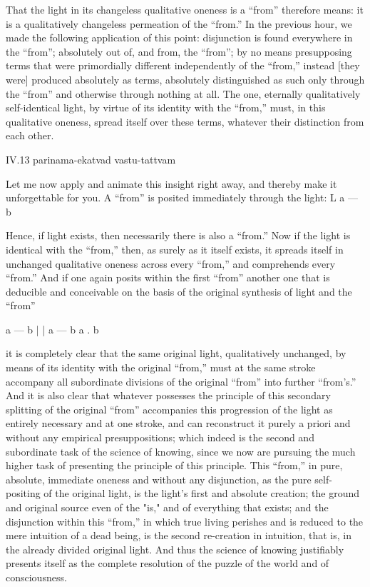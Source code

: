 That the light in its changeless qualitative oneness
is a “from” therefore means:
it is a qualitatively changeless
permeation of the “from.”
In the previous hour,
we made the following application of this point:
disjunction is found everywhere in the “from”;
absolutely out of, and from, the “from”;
by no means presupposing terms
that were primordially different
independently of the “from,”
instead [they were] produced absolutely as terms,
absolutely distinguished as such
only through the “from”
and otherwise through nothing at all.
The one, eternally qualitatively self-identical light,
by virtue of its identity with the “from,”
must, in this qualitative oneness,
spread itself over these terms,
whatever their distinction from each other.

IV.13
parinama-ekatvad vastu-tattvam

Let me now apply and animate this insight right away,
and thereby make it unforgettable for you.
A “from” is posited immediately through the light:
L
a — b

Hence, if light exists,
then necessarily there is also a “from.”
Now if the light is identical with the “from,”
then, as surely as it itself exists,
it spreads itself in unchanged qualitative oneness
across every “from,” and comprehends every “from.”
And if one again posits within the first “from”
another one that is deducible and conceivable
on the basis of the original synthesis of
light and the “from”

a — b
|
|
a — b  a . b

it is completely clear that
the same original light, qualitatively unchanged,
by means of its identity with the original “from,”
must at the same stroke accompany
all subordinate divisions of
the original “from” into further “from's.”
And it is also clear that whatever possesses
the principle of this secondary splitting
of the original “from” accompanies
this progression of the light
as entirely necessary and at one stroke,
and can reconstruct it purely a priori
and without any empirical presuppositions;
which indeed is the second and subordinate task
of the science of knowing,
since we now are pursuing the much higher task
of presenting the principle of this principle.
This “from,” in pure, absolute, immediate oneness
and without any disjunction,
as the pure self-positing of the original light,
is the light's first and absolute creation;
the ground and original source even of the "is,"
and of everything that exists;
and the disjunction within this “from,”
in which true living perishes
and is reduced to the mere intuition of a dead being,
is the second re-creation in intuition,
that is, in the already divided original light.
And thus the science of knowing
justifiably presents itself
as the complete resolution of
the puzzle of the world
and of consciousness.

